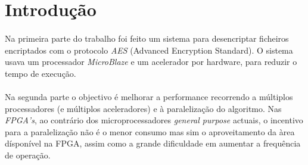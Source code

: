 \section{Introdução}

\paragraph{}
Na primeira parte do trabalho foi feito um sistema para desencriptar ficheiros encriptados com o protocolo \textit{AES} (Advanced Encryption Standard). O sistema usava um processador \textit{MicroBlaze} e um acelerador por hardware, para reduzir o tempo de execução.

\paragraph{}
Na segunda parte o objectivo é melhorar a performance recorrendo a múltiplos processadores (e múltiplos aceleradores) e à paralelização do algoritmo. 
Nas \textit{FPGA's}, ao contrário dos microprocessadores \textit{general purpose} actuais, o incentivo para a paralelização não é o menor consumo mas sim o aproveitamento da àrea dísponível na FPGA, assim como a grande dificuldade em aumentar a frequência de operação.
